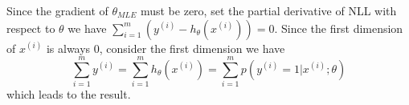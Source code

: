 \begin{answer}
Since the gradient of $ \theta_{MLE} $ must be zero, set the partial derivative of NLL with respect to $ \theta $ we have
$  \sum_{i=1}^{m}(y^{(i)}-h_{\theta}(x^{(i)})) = 0  $. Since the first dimension of $ x^{(i)} $ is always 0, consider the first dimension we have
\[ \sum_{i=1}^{m}y^{(i)}=\sum_{i=1}^{m}h_{\theta}(x^{(i)})=\sum_{i=1}^{m} p(y^{(i)}=1|x^{(i)};\theta)\]
 which leads to the result.
\end{answer}
